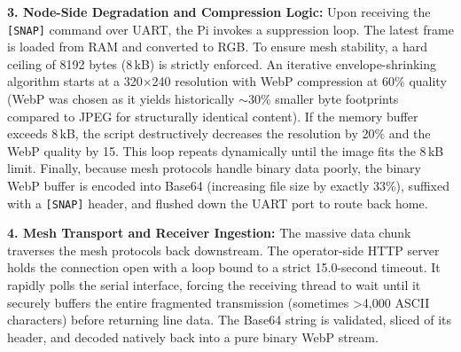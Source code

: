 \textbf{3. Node-Side Degradation and Compression Logic:} Upon receiving the \texttt{[SNAP]} command over UART, the Pi invokes a suppression loop. The latest frame is loaded from RAM and converted to RGB. To ensure mesh stability, a hard ceiling of 8192 bytes (8\,kB) is strictly enforced. An iterative envelope-shrinking algorithm starts at a 320$\times$240 resolution with WebP compression at 60\% quality (WebP was chosen as it yields historically $\sim$30\% smaller byte footprints compared to JPEG for structurally identical content). If the memory buffer exceeds 8\,kB, the script destructively decreases the resolution by 20\% and the WebP quality by 15. This loop repeats dynamically until the image fits the 8\,kB limit. Finally, because mesh protocols handle binary data poorly, the binary WebP buffer is encoded into Base64 (increasing file size by exactly 33\%), suffixed with a \texttt{[SNAP]} header, and flushed down the UART port to route back home.

\textbf{4. Mesh Transport and Receiver Ingestion:} The massive data chunk traverses the mesh protocols back downstream. The operator-side HTTP server holds the connection open with a loop bound to a strict 15.0-second timeout. It rapidly polls the serial interface, forcing the receiving thread to wait until it securely buffers the entire fragmented transmission (sometimes >4,000 ASCII characters) before returning line data. The Base64 string is validated, sliced of its header, and decoded natively back into a pure binary WebP stream.

